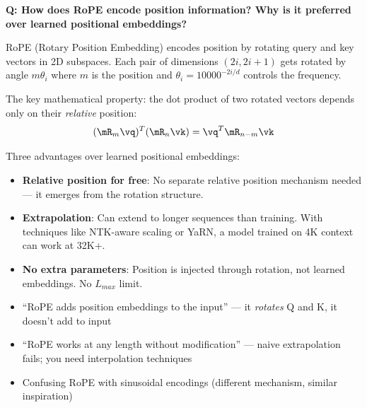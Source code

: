 \begin{interviewq}
\textbf{Q: How does RoPE encode position information? Why is it preferred over learned positional embeddings?}

 \quad {} \quad \badgefreq{\freqhigh}

\stronganswer RoPE (Rotary Position Embedding) encodes position by rotating query and key vectors in 2D subspaces. Each pair of dimensions $(2i, 2i+1)$ gets rotated by angle $m\theta_i$ where $m$ is the position and $\theta_i = 10000^{-2i/d}$ controls the frequency.

The key mathematical property: the dot product of two rotated vectors depends only on their \textit{relative} position:
\[(\mR_m \vq)^T (\mR_n \vk) = \vq^T \mR_{n-m} \vk\]

Three advantages over learned positional embeddings:
\begin{itemize}
    \item \textbf{Relative position for free}: No separate relative position mechanism needed --- it emerges from the rotation structure.
    \item \textbf{Extrapolation}: Can extend to longer sequences than training. With techniques like NTK-aware scaling or YaRN, a model trained on 4K context can work at 32K+.
    \item \textbf{No extra parameters}: Position is injected through rotation, not learned embeddings. No $L_{max}$ limit.
\end{itemize}

\redflags
\begin{itemize}
    \item ``RoPE adds position embeddings to the input'' --- it \textit{rotates} Q and K, it doesn't add to input
    \item ``RoPE works at any length without modification'' --- naive extrapolation fails; you need interpolation techniques
    \item Confusing RoPE with sinusoidal encodings (different mechanism, similar inspiration)
\end{itemize}



\end{interviewq}
